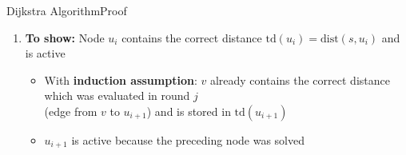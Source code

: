 
\begin{frame}{Dijkstra Algorithm}{Proof}
  \begin{figure}[!h]
    \begin{adjustbox}{width=0.9\linewidth}
      \def\DijkstraTD{1}%
      
    \end{adjustbox}
  \end{figure}
  \begin{enumerate}
    \item
      \textbf{To show:} Node {\color{MainA}$u_i$} contains the correct
      distance {\color{MainA}$\mathrm{td}(u_i) = \mathrm{dist}(s, u_i)$}
      and is active
      \begin{itemize}
        \item
          With \textbf{induction assumption}:
          {\color{MainA}$v$} already contains the correct distance which
          was evaluated in round {\color{MainA}$j$}\\
          (edge from {\color{MainA}$v$} to {\color{MainA}$u_{i+1}$})
          and is stored in {\color{MainA}$\mathrm{td}(u_{i+1})$}
        \item
          {\color{MainA}$u_{i+1}$} is active because the preceding node
          was solved
      \end{itemize}
  \end{enumerate}
\end{frame}


